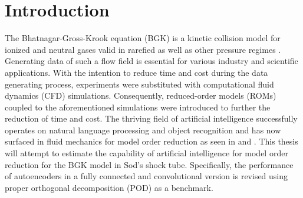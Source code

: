 
\chapter{Introduction}
\label{CH:intro}


The Bhatnagar-Gross-Krook equation (BGK) is a kinetic collision model for ionized and neutral gases valid in rarefied as well as other pressure regimes \cite{BGK}. Generating data of such a flow field is essential for various industry and scientific applications\cite{rarefiedGDapplc}. With the intention to reduce time and cost during the data generating process, experiments were substituted with computational fluid dynamics (CFD) simulations. Consequently, reduced-order models (ROMs) coupled to the aforementioned simulations were introduced to further the reduction of time and cost. The thriving field of artificial intelligence successfully operates on natural language processing and object recognition and has now surfaced in fluid mechanics for model order reduction as seen in \cite{Carlberg} and \cite{bukka2020assessment}. This thesis will attempt to estimate the capability of artificial intelligence for model order reduction for the BGK model in Sod's shock tube. Specifically, the performance of autoencoders in a fully connected and convolutional version is revised using proper orthogonal decomposition (POD) as a benchmark.\\

